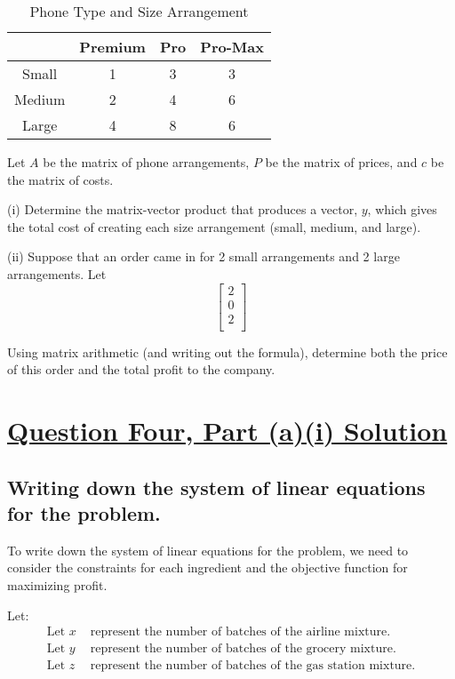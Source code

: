 \documentclass{article}
\begin{document}
\begin{table}[h]
\centering
\begin{tabular}{|c|c|c|c|}
\hline
& Premium & Pro & Pro-Max \\
\hline
Small & 1 & 3 & 3 \\
Medium & 2 & 4 & 6 \\
Large & 4 & 8 & 6 \\
\hline
\end{tabular}
\caption{Phone Type and Size Arrangement}
\end{table}

Let $A$ be the matrix of phone arrangements, $P$ be the matrix of prices, and $c$ be the matrix of costs.

(i) Determine the matrix-vector product that produces a vector, $y$, which gives the total cost of creating each size arrangement (small, medium, and large).

(ii) Suppose that an order came in for 2 small arrangements and 2 large arrangements. Let
\[
\begin{bmatrix}
2 \\
0 \\
2 \\
\end{bmatrix}
\]

Using matrix arithmetic (and writing out the formula), determine both the price of this order and the total profit to the company.

\section*{\uline{\large Question Four, Part (a)(i) Solution}}

\subsection*{Writing down the system of linear equations for the problem.}
To write down the system of linear equations for the problem, we need to consider the constraints for each ingredient and the objective function for maximizing profit.

Let:
\begin{align*}
\text{Let } x & \text{ represent the number of batches of the airline mixture.} \\
\text{Let } y & \text{ represent the number of batches of the grocery mixture.} \\
\text{Let } z & \text{ represent the number of batches of the gas station mixture.}
\end{align*}
\end{document}
